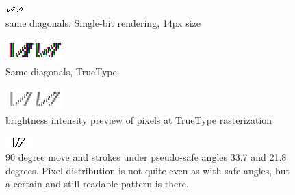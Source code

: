 \documentclass[a4paper]{article}
\begin{document}
\begin{figure} [H]
  \includegraphics [width =\linewidth] {pics/bw.png}
  \caption {same diagonals. Single-bit rendering, 14px size}
\end{figure}

\begin{figure} [H]
  \includegraphics [width =\linewidth] {pics/truetype.png}
  \caption {Same diagonals, TrueType}
\end{figure}

\begin{figure} [H]
  \includegraphics [width =\linewidth] {pics/truetype_bw.png}
  \caption {brightness intensity preview of pixels at TrueType rasterization}
\end{figure}

\begin{figure} [H]
  \includegraphics [width =\linewidth] {pics/pseudo.png}
  \caption {90 degree move and strokes under pseudo-safe angles 33.7 and 21.8 degrees. Pixel distribution is not quite even as with safe angles, but a certain and still readable pattern is there.}
\end{figure}
\end{document}
